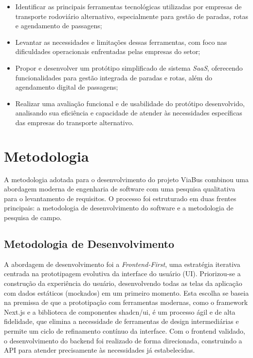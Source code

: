 \begin{itemize}
    \item Identificar as principais ferramentas tecnológicas utilizadas por empresas de transporte rodoviário alternativo, especialmente para gestão de paradas, rotas e agendamento de passagens;

    \item Levantar as necessidades e limitações dessas ferramentas, com foco nas dificuldades operacionais enfrentadas pelas empresas do setor;

    \item Propor e desenvolver um protótipo simplificado de sistema \textit{SaaS}, oferecendo funcionalidades para gestão integrada de paradas e rotas, além do agendamento digital de passagens;

    \item Realizar uma avaliação funcional e de usabilidade do protótipo desenvolvido, analisando sua eficiência e capacidade de atender às necessidades específicas das empresas do transporte alternativo.
\end{itemize}

\section{Metodologia}

A metodologia adotada para o desenvolvimento do projeto ViaBus combinou uma abordagem moderna de engenharia de software com uma pesquisa qualitativa para o levantamento de requisitos. O processo foi estruturado em duas frentes principais: a metodologia de desenvolvimento do software e a metodologia de pesquisa de campo.

\subsection{Metodologia de Desenvolvimento}

A abordagem de desenvolvimento foi a \textit{Frontend-First}, uma estratégia iterativa centrada na prototipagem evolutiva da interface do usuário (UI). Priorizou-se a construção da experiência do usuário, desenvolvendo todas as telas da aplicação com dados estáticos (mockados) em um primeiro momento. Esta escolha se baseia na premissa de que a prototipação com ferramentas modernas, como o framework Next.js e a biblioteca de componentes shadcn/ui, é um processo ágil e de alta fidelidade, que elimina a necessidade de ferramentas de design intermediárias e permite um ciclo de refinamento contínuo da interface. Com o frontend validado, o desenvolvimento do backend foi realizado de forma direcionada, construindo a API para atender precisamente às necessidades já estabelecidas.

